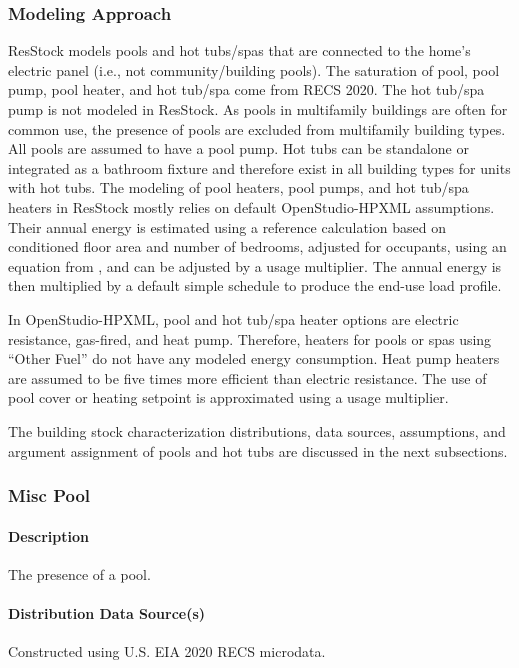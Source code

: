 \subsubsection{Modeling Approach}
ResStock models pools and hot tubs/spas that are connected to the home's electric panel (i.e., not community/building pools). The saturation of pool, pool pump, pool heater, and hot tub/spa come from RECS 2020. The hot tub/spa pump is not modeled in ResStock. As pools in multifamily buildings are often for common use, the presence of pools are excluded from multifamily building types. All pools are assumed to have a pool pump. Hot tubs can be standalone or integrated as a bathroom fixture and therefore exist in all building types for units with hot tubs. The modeling of pool heaters, pool pumps, and hot tub/spa heaters in ResStock mostly relies on default OpenStudio-HPXML assumptions. Their annual energy is estimated using a reference calculation based on conditioned floor area and number of bedrooms, adjusted for occupants, using an equation from \citet{bahsp_2010}, and can be adjusted by a usage multiplier. The annual energy is then multiplied by a default simple schedule to produce the end-use load profile.

In OpenStudio-HPXML, pool and hot tub/spa heater options are electric resistance, gas-fired, and heat pump. Therefore, heaters for pools or spas using ``Other Fuel'' do not have any modeled energy consumption. Heat pump heaters are assumed to be five times more efficient than electric resistance. The use of pool cover or heating setpoint is approximated using a usage multiplier. 

The building stock characterization distributions, data sources, assumptions, and argument assignment of pools and hot tubs are discussed in the next subsections.

\subsubsection{Misc Pool}
\paragraph{Description}
The presence of a pool.

\paragraph{Distribution Data Source(s)}
Constructed using U.S. EIA 2020 RECS microdata. 

